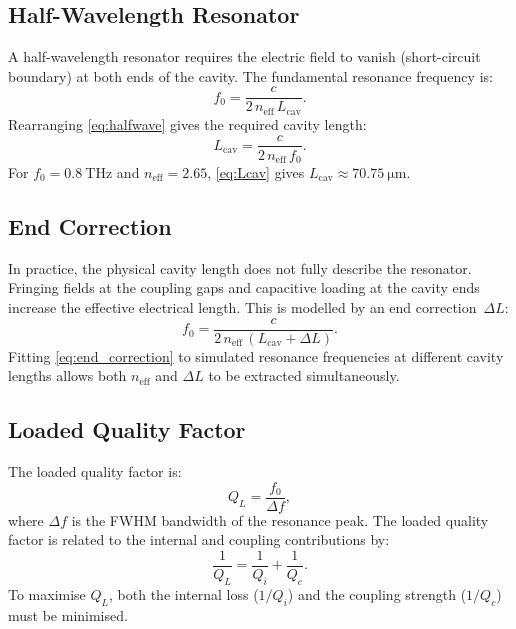 \documentclass[12pt,a4paper]{article}
\begin{document}
\subsection{Half-Wavelength Resonator}

A half-wavelength resonator requires the electric field to vanish
(short-circuit boundary) at both ends of the cavity. The fundamental
resonance frequency is:
\begin{equation}
    f_0 = \frac{c}{2\,n_{\mathrm{eff}}\,L_{\mathrm{cav}}}.
    \label{eq:halfwave}
\end{equation}
Rearranging \cref{eq:halfwave} gives the required cavity length:
\begin{equation}
    L_{\mathrm{cav}} = \frac{c}{2\,n_{\mathrm{eff}}\,f_0}.
    \label{eq:Lcav}
\end{equation}
For $f_0 = \SI{0.8}{\tera\hertz}$ and $n_{\mathrm{eff}} = 2.65$,
\cref{eq:Lcav} gives $L_{\mathrm{cav}} \approx \SI{70.75}{\micro\metre}$.

\subsection{End Correction}

In practice, the physical cavity length does not fully describe the
resonator. Fringing fields at the coupling gaps and capacitive loading
at the cavity ends increase the effective electrical length. This is
modelled by an end correction~$\Delta L$:
\begin{equation}
    f_0 = \frac{c}{2\,n_{\mathrm{eff}}\,(L_{\mathrm{cav}} + \Delta L)}.
    \label{eq:end_correction}
\end{equation}
Fitting \cref{eq:end_correction} to simulated resonance frequencies at
different cavity lengths allows both $n_{\mathrm{eff}}$ and $\Delta L$
to be extracted simultaneously.

\subsection{Loaded Quality Factor}

The loaded quality factor is:
\begin{equation}
    Q_L = \frac{f_0}{\Delta f},
    \label{eq:QL}
\end{equation}
where $\Delta f$ is the FWHM bandwidth of the resonance peak. The loaded
quality factor is related to the internal and coupling contributions by:
\begin{equation}
    \frac{1}{Q_L} = \frac{1}{Q_i} + \frac{1}{Q_c}.
    \label{eq:Q_relation}
\end{equation}
To maximise $Q_L$, both the internal loss ($1/Q_i$) and the coupling
strength ($1/Q_c$) must be minimised.
\end{document}
